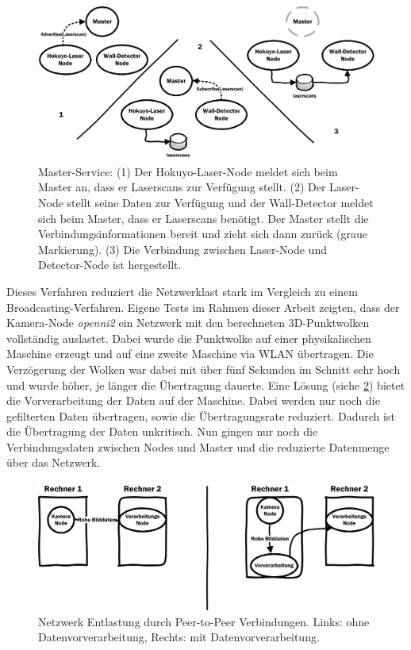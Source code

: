  \begin{figure}[h]
 	\centering
 	\includegraphics[scale=0.8]{fig/masternode}   
 	\caption[Master-Service]{Master-Service: (1) Der Hokuyo-Laser-Node meldet sich beim Master an, dass er Laserscans zur Verfügung stellt. (2) Der Laser-Node stellt seine Daten zur Verfügung und der Wall-Detector meldet sich beim Master, dass er Laserscans benötigt. Der Master stellt die Verbindungsinformationen bereit und zieht sich dann zurück (graue Markierung). (3) Die Verbindung zwischen Laser-Node und Detector-Node ist hergestellt.}
 	\label{fig:basic-ros-masternode}
 \end{figure}
 
 Dieses Verfahren reduziert die Netzwerklast stark im Vergleich zu einem Broadcasting-Verfahren. Eigene Tests im Rahmen dieser Arbeit zeigten, dass der Kamera-Node \textit{openni2} ein Netzwerk mit den berechneten 3D-Punktwolken vollständig auslastet. Dabei wurde die Punktwolke auf einer physikalischen Maschine  erzeugt und auf eine zweite Maschine via WLAN übertragen. Die Verzögerung der Wolken war dabei mit über fünf Sekunden im Schnitt sehr hoch und wurde höher, je länger die Übertragung dauerte. Eine Lösung (siehe \ref{fig:basic-ros-masternet}) bietet die Vorverarbeitung der Daten auf der Maschine. Dabei werden nur noch die gefilterten Daten übertragen, sowie die Übertragungsrate reduziert. Dadurch ist die Übertragung der Daten unkritisch. Nun gingen nur noch die Verbindungsdaten zwischen Nodes und Master und die reduzierte Datenmenge über das Netzwerk.
 
 \begin{figure}[h]
 	\centering
 	\includegraphics[scale=0.8]{fig/masternet}   
 	\caption[Netzwerk Entlastung durch Peer-to-Peer Verbindungen]{Netzwerk Entlastung durch Peer-to-Peer Verbindungen. Links: ohne Datenvorverarbeitung, Rechts: mit Datenvorverarbeitung.}
 	\label{fig:basic-ros-masternet}
 \end{figure}
 
